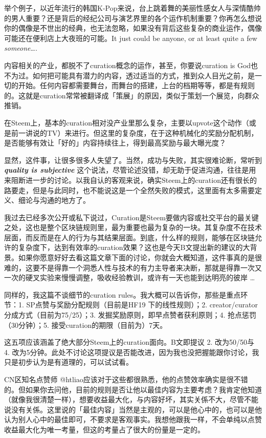 \documentclass[]{ctexbook}
\begin{document}
举个例子，以近年流行的韩国K-Pop来说，台上跳着舞的美丽性感女人与深情酷帅的男人重要？还是背后的经纪公司与演艺界里的各个运作机制重要？你再怎么想说你的偶像是不世出的经典，也无法忽略，如果没有背后这些复杂的商业运作，偶像可能还在便利店上大夜班的可能。It just could be anyone, or at least quite a few \emph{someone}\ldots{}.

内容相关的产业，都脱不了curation概念的运作，甚至，你要说curation is God也不为过。如何把可能具有潜力的内容，透过适当的方式，推到众人目光之前，是一切的开始。任何内容都需要舞台，而舞台的搭建，上台的档期等等，都是有规则的。这就是curation常常被翻译成「策展」的原因，类似于策划一个展览，向群众推销。

在Steem上，基本的curation相对没产业里那么复杂，主要以upvote这个动作（或是前一讲说的TV）来进行。但这里的复杂度，在于这种机械化的奖励分配机制，是否能够有效让「好的」内容持续往上，得到最高奖励与最大曝光度？

显然，这件事，让很多很多人失望了。当然，成功与失败，其实很难论断，常听到 \textbf{\emph{quality is subjective}} 这个说法，尽管论述没错，却无助于促进沟通，往往是用来阻断进一步的讨论。以我自认的客观来说，确实Steem上的curation还有很长的路要走，但是与此同时，也不能说这是一个全然失败的模式，这里面有太多需要定义、细论与沟通的地方了。

我过去已经多次公开或私下说过，Curation是Steem要做内容或社交平台的最关键之处，这也是整个区块链规则里，最为重要也最为复杂的一块。其复杂度不在技术层面，而反而是在人的行为与其结果层面。到底，什么样的规则，能够在区块链允许的复杂度下，达到有效率的curation效果？这也是今天B文提出新的建议的大背景。如果你愿意好好去看这篇文章下面的讨论，你就会大概知道，这件事真的是很难的，这要不是得靠一个洞悉人性与技术的有力主导者来决断，那就是得靠一次又一次的硬叉实验来慢慢调整，吸收经验教训，或许有一天也能到达明亮的彼岸 \ldots{}

同样的，我这篇不谈细节的curation rules。我大概可以告诉你，那些是重点环节：1. SP点赞与奖励分配规则（目前是HF19 下的线性规则）；2. creator/curator分成方式（目前为75/25）；3. 发掘奖励原则，即早点赞者获利原则；4. 抢点惩罚（30分钟）；5. 接受curation的期限（目前为）7天。

这五项应该涵盖了绝大部分Steem上的curation面向。B文即提议 2. 改为50/50与 4. 改为5分钟。此处不讨论这项提议是否能改进，因为我也没把握能跟你讨论，我只是初步认为是有道理的，可以试试看。

CN区知名点赞师 @htliao应该对于这些都很熟悉，他的点赞效率确实是很不错的。但如果你去问他，目前的规则是否让他以最佳内容为主要考虑？我肯定他知道（就像我很清楚一样），想要收益最大化，与内容好坏，其实关係不大，尽管不能说没有关係。这里说的「最佳内容」当然是主观的，可以是他心中的，也可以是他认为别人心中的最佳即可，不要求是客观事实。我想他跟我一样，不会单纯以点赞收益最大化为唯一考量，但这的考量占了很大的份量是一定的。
\end{document}
